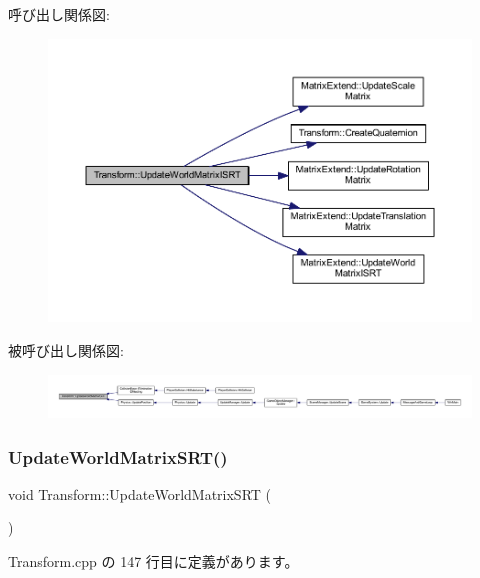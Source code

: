 呼び出し関係図\+:\nopagebreak
\begin{figure}[H]
\begin{center}
\leavevmode
\includegraphics[width=350pt]{class_transform_a3d56e19fba7f44d5f938d62481846fbc_cgraph}
\end{center}
\end{figure}
被呼び出し関係図\+:
\nopagebreak
\begin{figure}[H]
\begin{center}
\leavevmode
\includegraphics[width=350pt]{class_transform_a3d56e19fba7f44d5f938d62481846fbc_icgraph}
\end{center}
\end{figure}
\mbox{\label{class_transform_af1a2dcb4a9d37dd71c203ec248535887}} 
\subsubsection{\texorpdfstring{Update\+World\+Matrix\+S\+R\+T()}{UpdateWorldMatrixSRT()}}
{\footnotesize\ttfamily void Transform\+::\+Update\+World\+Matrix\+S\+RT (\begin{DoxyParamCaption}{ }\end{DoxyParamCaption})}



 Transform.\+cpp の 147 行目に定義があります。

